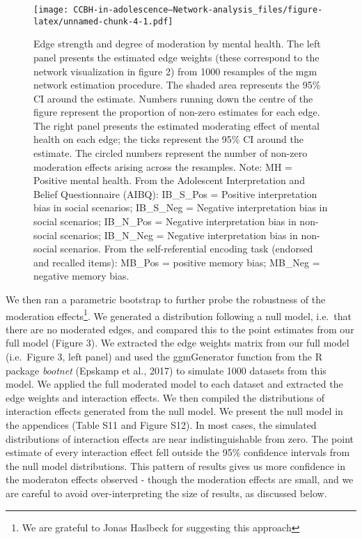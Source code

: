 \documentclass[
  english,
  man,floatsintext]{apa6}
\begin{document}
\begin{figure}
\centering
\texttt{[image: CCBH-in-adolescence---Network-analysis\_files/figure-latex/unnamed-chunk-4-1.pdf]}
\caption{\label{fig:unnamed-chunk-4}Edge strength and degree of moderation by mental health. The left panel presents the estimated edge weights (these correspond to the network visualization in figure 2) from 1000 resamples of the mgm network estimation procedure. The shaded area represents the 95\% CI around the estimate. Numbers running down the centre of the figure represent the proportion of non-zero estimates for each edge. The right panel presents the estimated moderating effect of mental health on each edge; the ticks represent the 95\% CI around the estimate. The circled numbers represent the number of non-zero moderation effects arising across the resamples. Note: MH = Positive mental health. From the Adolescent Interpretation and Belief Questionnaire (AIBQ): IB\_S\_Pos = Positive interpretation bias in social scenarios; IB\_S\_Neg = Negative interpretation bias in social scenarios; IB\_N\_Pos = Negative interpretation bias in non-social scenarios; IB\_N\_Neg = Negative interpretation bias in non-social scenarios. From the self-referential encoding task (endorsed and recalled items): MB\_Pos = positive memory bias; MB\_Neg = negative memory bias.}
\end{figure}

We then ran a parametric bootstrap to further probe the robustness of the moderation effects\footnote{We are grateful to Jonas Haslbeck for suggesting this approach}. We generated a distribution following a null model, i.e.~that there are no moderated edges, and compared this to the point estimates from our full model (Figure 3). We extracted the edge weights matrix from our full model (i.e.~Figure 3, left panel) and used the ggmGenerator function from the R package \emph{bootnet} (Epskamp et al., 2017) to simulate 1000 datasets from this model. We applied the full moderated model to each dataset and extracted the edge weights and interaction effects. We then compiled the distributions of interaction effects generated from the null model. We present the null model in the appendices (Table S11 and Figure S12). In most cases, the simulated distributions of interaction effects are near indistinguishable from zero. The point estimate of every interaction effect fell outside the 95\% confidence intervals from the null model distributions. This pattern of results gives us more confidence in the moderaton effects observed - though the moderation effects are small, and we are careful to avoid over-interpreting the size of results, as discussed below.
\end{document}
